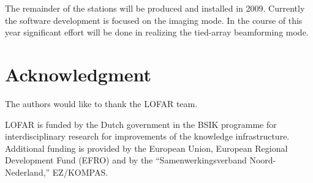 \documentclass[journal]{IEEEtran}
\begin{document}
The remainder of the stations will be produced and installed in 2009. Currently the software development is focused on the imaging mode. In the course of this year significant effort will be done in realizing the tied-array beamforming mode.



%



\section{}


\section*{Acknowledgment}


The authors would like to thank the LOFAR team. 

LOFAR is funded by the Dutch government in the BSIK programme for
interdisciplinary research for improvements of the knowledge infrastructure.
Additional funding is provided by the European Union, European Regional
Development Fund (EFRO) and by the ``Samenwerkingsverband Noord-Nederland,''
EZ/KOMPAS.
\end{document}
